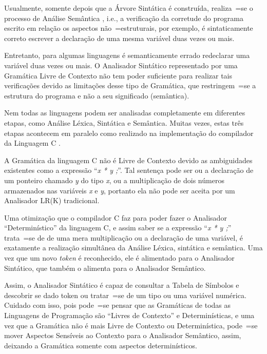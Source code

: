 {    Usualmente,
    somente depois que a Árvore Sintática é construída,
    realiza~=se o processo de Análise Semântica \cite{ahoCompilerDragonBook},
    i.e.,
    a verificação da corretude do programa escrito em relação os aspectos não~=estruturais,
    por exemplo,
    é sintaticamente correto escrever a declaração de uma mesma variável duas vezes ou
    mais.

    Entretanto,
    para algumas linguagens é semanticamente errado redeclarar uma variável duas vezes ou
    mais.
    O Analisador Sintático representado por uma Gramática Livre de Contexto não tem poder suficiente para realizar tais verificações devido as limitações desse tipo de Gramática,
    que restringem~=se a estrutura do programa e
    não a seu significado (semântica).

    Nem todas as linguagens podem ser analisadas completamente em diferentes etapas,
    como Análise Léxica, Sintática e Semântica. Muitas vezes,
    estas três etapas acontecem em paralelo como realizado na implementação do compilador da Linguagem C \cite{jourdan2017,whyCcannotBeParsedWithALR1Parser}.

    A Gramática da linguagem C não é Livre de Contexto devido as ambiguidades existentes como a expressão ``\textit{x * y ;}''.
    Tal sentença pode ser ou
    a declaração de um ponteiro chamado \textit{y} do tipo \textit{x},
    ou a multiplicação de dois números armazenados nas variáveis \textit{x} e
    \textit{y},
    portanto ela não pode ser aceita por um Analisador LR(K) tradicional.

    Uma otimização que o compilador C faz para poder fazer o Analisador ``Determinístico'' da linguagem C,
    e assim saber se a expressão ``\textit{x * y ;}'' trata~=se de de uma mera multiplicação ou
    a declaração de uma variável,
    é exatamente a realização simultânea da Análise Léxica,
    sintática e
    semântica.
    Uma vez que um novo \textit{token} é reconhecido,
    ele é alimentado para o Analisador Sintático,
    que também o alimenta para o Analisador Semântico.

    Assim,
    o Analisador Sintático é capaz de consultar a Tabela de Símbolos \cite{ahoCompilerDragonBook} e
    descobrir se dado token ou
    tratar~=se de um tipo ou
    uma variável numérica.
    Cuidado com isso,
    pois pode~=se pensar que as Gramáticas de todas as Linguagens de Programação são ``Livres de Contexto'' e
    Determinísticas,
    e uma vez que a Gramática não é mais Livre de Contexto ou
    Determinística,
    pode~=se mover Aspectos Sensíveis ao Contexto para o Analisador Semântico,
    assim,
    deixando a Gramática somente com aspectos determinísticos.


}
